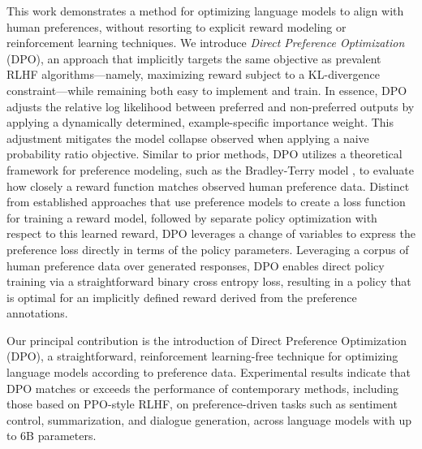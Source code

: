This work demonstrates a method for optimizing language models to align with human preferences, without resorting to explicit reward modeling or reinforcement learning techniques. We introduce \textit{Direct Preference Optimization} (DPO), an approach that implicitly targets the same objective as prevalent RLHF algorithms—namely, maximizing reward subject to a KL-divergence constraint—while remaining both easy to implement and train. In essence, DPO adjusts the relative log likelihood between preferred and non-preferred outputs by applying a dynamically determined, example-specific importance weight. This adjustment mitigates the model collapse observed when applying a naive probability ratio objective. Similar to prior methods, DPO utilizes a theoretical framework for preference modeling, such as the Bradley-Terry model \cite{bradley1952rankanalysis}, to evaluate how closely a reward function matches observed human preference data. Distinct from established approaches that use preference models to create a loss function for training a reward model, followed by separate policy optimization with respect to this learned reward, DPO leverages a change of variables to express the preference loss directly in terms of the policy parameters. Leveraging a corpus of human preference data over generated responses, DPO enables direct policy training via a straightforward binary cross entropy loss, resulting in a policy that is optimal for an implicitly defined reward derived from the preference annotations.

Our principal contribution is the introduction of Direct Preference Optimization (DPO), a straightforward, reinforcement learning-free technique for optimizing language models according to preference data. Experimental results indicate that DPO matches or exceeds the performance of contemporary methods, including those based on PPO-style RLHF, on preference-driven tasks such as sentiment control, summarization, and dialogue generation, across language models with up to 6B parameters.

